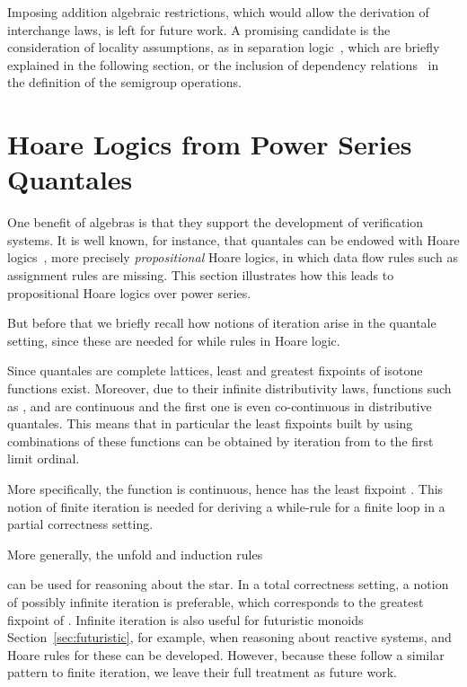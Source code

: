 \documentclass[12pt]{article}
\theoremstyle{definition}
\newcommand{\refsec}[1]{Section~\ref{#1}}
\begin{document}
Imposing addition algebraic restrictions, which would allow the
derivation of interchange laws, is left for future work. A promising
candidate is the consideration of locality assumptions, as in
separation logic~\cite{COY07}, which are briefly explained in the
following section, or the inclusion of dependency
relations~\cite{HMSW11} in the definition of the semigroup operations.



\section{Hoare Logics from Power Series Quantales}\label{sec:hoare}

One benefit of algebras is that they support the development of
verification systems. It is well known, for instance, that quantales
can be endowed with Hoare logics~\cite{HMSW11}, more precisely
\emph{propositional} Hoare logics, in which data flow rules such as
assignment rules are missing. This section illustrates how this leads to
propositional Hoare logics over power series. 

But before that we briefly recall how notions of iteration arise in
the quantale setting, since these are needed for while rules in Hoare
logic. 

Since quantales are complete lattices, least and greatest fixpoints of
isotone functions exist. Moreover, due to their infinite
distributivity laws, functions such as ,
 and 
are continuous and the first one is even co-continuous in distributive
quantales. This means that in particular the least fixpoints built by
using combinations of these functions can be obtained by iteration
from  to the first limit ordinal.

More specifically, the function  is continuous, hence has the least fixpoint
. This
notion of finite iteration is needed for deriving a while-rule for a
finite loop in a partial correctness setting.

More generally, the unfold and induction rules

can be used for reasoning about the star. In a total correctness
setting, a notion of possibly infinite iteration is preferable, which
corresponds to the greatest fixpoint of . Infinite iteration
is also useful for futuristic monoids \refsec{sec:futuristic}, for
example, when reasoning about reactive systems, and Hoare rules for
these can be developed. However, because these follow a similar
pattern to finite iteration, we leave their full treatment as future
work.
\end{document}
